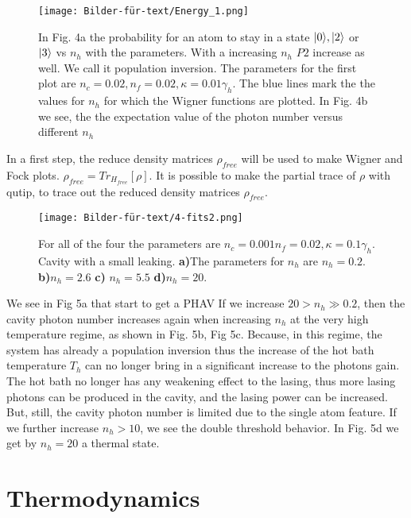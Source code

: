 \documentclass[12pt,a4paper]{article}
\DeclarePairedDelimiter\ket{\lvert}{\rangle}
\begin{document}
\begin{figure}[h!]
\hspace{-1cm}
\texttt{[image: Bilder-für-text/Energy\_1.png]}
\caption{In Fig. 4a the probability for an atom to stay in a state $\ket{0}, \ket{2}$ or $\ket{3}$ vs $n_h$ with the parameters. With a increasing $n_h$ $P2$ increase as well. We call it population inversion.  The parameters for the first plot are $n_c=0.02 ,n_f=0.02,\kappa=0.01\gamma_h $. The blue lines mark the the values for $ n_h$ for which the Wigner functions are plotted. In Fig. 4b we see, the the expectation value of the photon number versus different $n_h$ }
\end{figure}
\newpage
In a first step, the reduce density matrices $\rho_{free}$ will be used to make Wigner and Fock plots.
$\rho_{free}=Tr_{H_{free}}[\rho]$.
It is possible to make the partial trace of $\rho$ with qutip, to trace out the reduced density matrices $\rho_{free}$. 
\begin{figure}[h!]
\centering
\texttt{[image: Bilder-für-text/4-fits2.png]}
\caption{For all of the four the parameters are $n_c=0.001 n_f=0.02,\kappa=0.1\gamma_h$. Cavity with a small leaking.
\textbf{a)}The parameters for $n_h$ are $n_h=0.2 $.
\textbf{b)}$ n_h=2.6$ 
\textbf{c)} $ n_h=5.5$ 
\textbf{d)}$ n_h=20$. 
}
\end{figure}
\newpage
We see in Fig 5a that start to get a PHAV
If we increase  $20>n_h \gg 0.2 $,
then the cavity photon number increases again when increasing $n_h$ at the very
high temperature regime, as shown in Fig. 5b, Fig 5c. Because,
in this regime, the system has already a population inversion
thus the increase of the hot bath temperature $T_h$
can no longer bring in a significant increase to the photons gain.
The hot bath no longer has
any weakening effect to the lasing, thus more lasing photons
can be produced in the cavity, and the lasing power can be
increased. But, still, the cavity photon number is limited due to
the single atom feature.
If we further increase  $n_h >10$, we see the double threshold behavior. 
In Fig. 5d we get by $n_h=20$ a thermal state.
\section{Thermodynamics}
\end{document}
